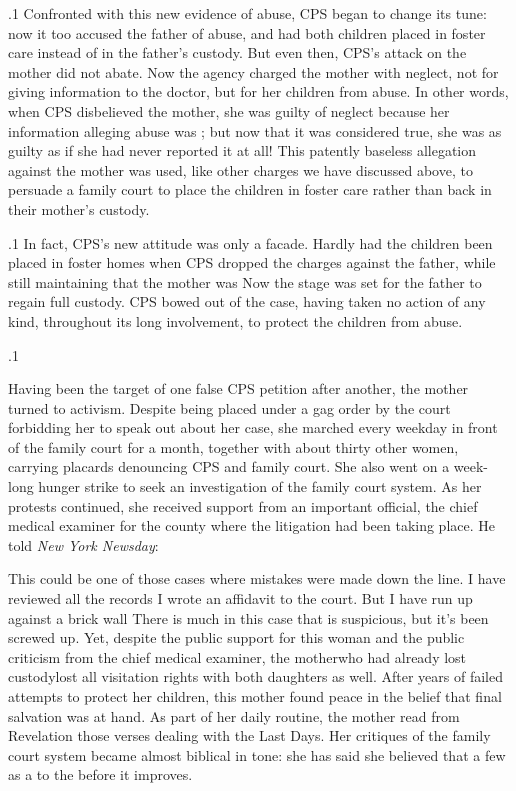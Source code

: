 \documentclass[11pt, twoside]{article}
\begin{document}
{\p.1{%
Confronted with this new evidence of abuse, CPS began to change
its tune: now it too accused the father of abuse, and had both children
placed in foster care instead of in the father's custody. But even then,
CPS's attack on the mother did not abate. Now the agency charged the
mother with neglect, not for giving  information to the doctor, but
for  her children from abuse. In other words, when
CPS disbelieved the mother, she was guilty of neglect because her information alleging abuse was ; but now that it was considered true,
she was as guilty as if she had never reported it at all! This patently baseless allegation against the mother was used, like other charges we have
discussed above, to persuade a family court to place the children in foster care
rather than back in their mother's custody.
}%

\p.1{%
In fact, CPS's new attitude was only a facade. Hardly had the children
been placed in foster homes when CPS dropped the charges against the
father, while still maintaining that the mother was  Now
the stage was set for the father to regain
full custody. CPS bowed out of the case, having
taken no action of any kind, throughout its long
involvement, to protect the children from abuse.
}%

\p.1{%
Having been the target of one false CPS petition after another, the
mother turned to activism. Despite being placed under a gag order by
the court forbidding her to speak out about her case, she marched every
weekday in front of the family court for a month, together with about
thirty other women, carrying placards denouncing CPS and family
court. She also went on a week-long hunger strike to seek an investigation of the family court system. As her protests continued, she received
support from an important official, the chief medical examiner for the
county where the litigation had been taking place. He told \textit{New York
Newsday}:

\begin{blockQuote}
This could be one of those cases where mistakes were made down
the line. I have reviewed all the records\ellFour{2pt}{2pt} I wrote an affidavit to
the court. But I have run up against a brick wall\ellFour{2pt}{2pt} There is much
in this case that is suspicious, but it's been screwed up.
Yet, despite the public support for this woman and the public criticism from the chief medical examiner, the mother\mdash{}who had already
lost custody\mdash{}lost all visitation rights with both daughters as well.
After years of failed attempts to protect her children, this mother
found peace in the belief that final salvation was at hand. As part of
her daily routine, the mother read from Revelation those verses dealing with the Last Days. Her critiques of the family court system became
almost biblical in tone: she has said she  believed that a few  as a  to the 
before it improves.
\end{blockQuote}

}}
\end{document}
